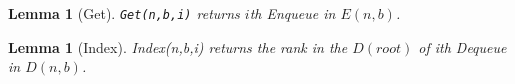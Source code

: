 \documentclass[10pt]{article}
\renewcommand{\tt}[1]{\texttt{#1}}
\newtheorem{lemma}[theorem]{Lemma}
\theoremstyle{definition}
\begin{document}
\begin{lemma}[Get] \label{get}
\tt{Get(n,b,i)} returns $i$th Enqueue in $E(n,b)$.
\end{lemma}

\begin{lemma}[Index]
 Index(n,b,i) returns the rank in the $D(root)$ of ith Dequeue in $D(n,b)$.
\end{lemma}
\end{document}

